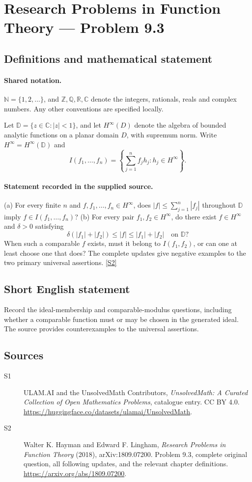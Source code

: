 \documentclass[11pt]{book}
\newcommand{\sref}[2]{\hyperlink{source:#1:#2}{[S#2]}}
\begin{document}
\section{Research Problems in Function Theory — Problem 9.3}\label{statement}

\subsection{Definitions and mathematical statement}

\paragraph{Shared notation.}$\mathbb N=\{1,2,\ldots\}$, and $\mathbb Z,\mathbb Q,\mathbb R,\mathbb C$ denote the integers, rationals, reals and complex numbers. Any other conventions are specified locally.


Let $\mathbb D=\{z\in\mathbb C:|z|<1\}$, and let $H^{\infty}(D)$ denote the algebra of bounded analytic functions on a planar domain $D$, with supremum norm. Write $H^{\infty}=H^{\infty}(\mathbb D)$ and \[I(f_1,\ldots,f_n)=\left\{\sum_{j=1}^nf_jh_j:h_j\in H^{\infty}\right\}.\]
\paragraph{Statement recorded in the supplied source.}
(a) For every finite $n$ and $f,f_1,\ldots,f_n\in H^{\infty}$, does $|f|\le\sum_{j=1}^n|f_j|$ throughout $\mathbb D$ imply $f\in I(f_1,\ldots,f_n)$? (b) For every pair $f_1,f_2\in H^{\infty}$, do there exist $f\in H^{\infty}$ and $\delta>0$ satisfying \[\delta(|f_1|+|f_2|)\le|f|\le|f_1|+|f_2|\quad\text{on }\mathbb D?\] When such a comparable $f$ exists, must it belong to $I(f_1,f_2)$, or can one at least choose one that does? The complete updates give negative examples to the two primary universal assertions. \sref{statement}{2}
\subsection{Short English statement}
Record the ideal-membership and comparable-modulus questions, including whether a comparable function must or may be chosen in the generated ideal. The source provides counterexamples to the universal assertions.
\subsection{Sources}
\begin{description}
\item[\hypertarget{source:statement:1}{S1}] ULAM.AI and the UnsolvedMath Contributors, \emph{UnsolvedMath: A Curated Collection of Open Mathematics Problems}, catalogue entry. CC BY 4.0. \url{https://huggingface.co/datasets/ulamai/UnsolvedMath}.
\item[\hypertarget{source:statement:2}{S2}] Walter K. Hayman and Edward F. Lingham, \emph{Research Problems in Function Theory} (2018), arXiv:1809.07200. Problem 9.3, complete original question, all following updates, and the relevant chapter definitions. \url{https://arxiv.org/abs/1809.07200}.
\end{description}
\label{end:statement}
\end{document}
